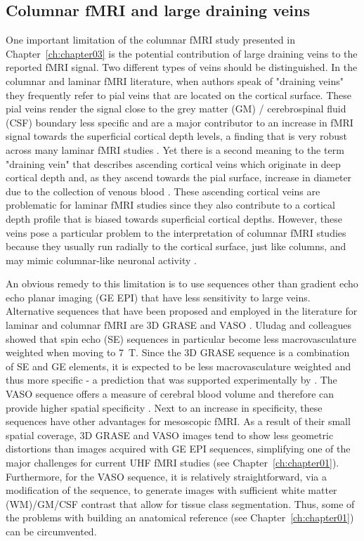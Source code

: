 \subsection{Columnar fMRI and large draining veins}
One important limitation of the columnar fMRI study presented in Chapter~\ref{ch:chapter03} is the potential contribution of large draining veins to the reported fMRI signal. Two different types of veins should be distinguished. In the columnar and laminar fMRI literature, when authors speak of "draining veins" they frequently refer to pial veins that are located on the cortical surface. These pial veins render the signal close to the grey matter (GM) / cerebrospinal fluid (CSF) boundary less specific \parencite{Polimeni2010, Moerel2017} and are a major contributor to an increase in fMRI signal towards the superficial cortical depth levels, a finding that is very robust across many laminar fMRI studies \parencite{Ress2007, Koopmans2010, Polimeni2010, Koopmans2011, DeMartino2013, Marquardt2018}. Yet there is a second meaning to the term "draining vein" that describes ascending cortical veins which originate in deep cortical depth and, as they ascend towards the pial surface, increase in diameter due to the collection of venous blood \parencite{Duvernoy1981}. These ascending cortical veins are problematic for laminar fMRI studies since they also contribute to a cortical depth profile that is biased towards superficial cortical depths. However, these veins pose a particular problem to the interpretation of columnar fMRI studies because they usually run radially to the cortical surface, just like columns, and may mimic columnar-like neuronal activity \parencite{DeMartino2016}.

An obvious remedy to this limitation is to use sequences other than gradient echo echo planar imaging (GE EPI) that have less sensitivity to large veins. Alternative sequences that have been proposed and employed in the literature for laminar and columnar fMRI are 3D GRASE \parencite{Feinberg2008, Zimmermann2011, DeMartino2013, Kemper2015, Moerel2017} and VASO \parencite{Huber2015, Huber2017}. Uludag and colleagues \parencite*{Uludag2009} showed that spin echo (SE) sequences in particular become less macrovasculature weighted when moving to 7~T. Since the 3D GRASE sequence is a combination of SE and GE elements, it is expected to be less macrovasculature weighted and thus more specific - a prediction that was supported experimentally by \cite{DeMartino2013}. The VASO sequence offers a measure of cerebral blood volume and therefore can provide higher spatial specificity \parencite{Huber2015, Huber2017}. Next to an increase in specificity, these sequences have other advantages for mesoscopic fMRI. As a result of their small spatial coverage, 3D GRASE and VASO images tend to show less geometric distortions than images acquired with GE EPI sequences, simplifying one of the major challenges for current UHF fMRI studies (see Chapter~\ref{ch:chapter01}). Furthermore, for the VASO sequence, it is relatively straightforward, via a modification of the sequence, to generate images with sufficient white matter (WM)/GM/CSF contrast that allow for tissue class segmentation. Thus, some of the problems with building an anatomical reference (see Chapter~\ref{ch:chapter01}) can be circumvented.

